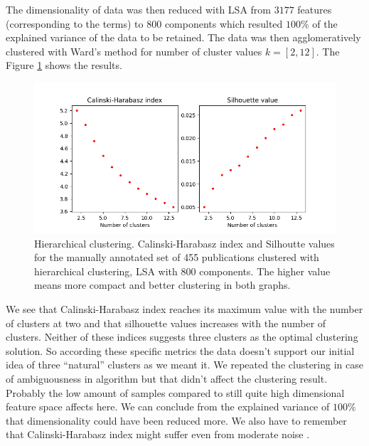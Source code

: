 The dimensionality of data was then reduced with LSA from $3177$
features (corresponding to the terms) to $800$ components which 
resulted $100\%$ of the explained variance of the data to be 
retained. The data was then agglomeratively clustered with Ward's 
method for number of cluster values $k=[2,12]$. 
The Figure \ref{fig:ch-silh01} shows the results. 
\begin{figure}[ht]
  \begin{center}    
\includegraphics[width=11.5cm]{images/c-h-silh-index-plot-455-2_12-800-hierarchical.png}
    \caption{Hierarchical clustering. Calinski-Harabasz index and Silhoutte values for the
    manually annotated set of 455 publications clustered with hierarchical
    clustering, LSA with 800 components. The higher value means
    more compact and better clustering in both graphs.}
    \label{fig:ch-silh01}
    \end{center}
\end{figure}
We see that Calinski-Harabasz index reaches its maximum value 
with the number of clusters at two and that silhouette values 
increases with the number of clusters.
Neither of these indices suggests three clusters as the optimal 
clustering solution. So according these specific metrics the data 
doesn't support our initial idea of three ``natural'' clusters as
we meant it. We repeated the clustering in case of ambiguousness
in algorithm but that didn't affect the clustering result.
Probably the low amount of samples compared to 
still quite high dimensional feature space affects here. We can 
conclude from the explained variance of $100\%$ that dimensionality
could have been reduced more. We also 
have to remember that Calinski-Harabasz index might suffer even 
from moderate noise \cite{liu_understanding_2010}.

